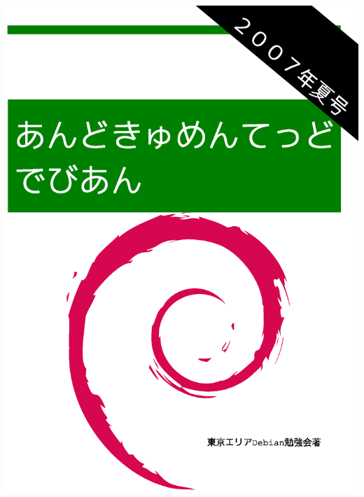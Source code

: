 \documentclass[mingoth,a4paper]{jsarticle}
\begin{document}
\begin{titlepage}

\includegraphics[height=252mm]{image2007-natsu/2007-summer.eps}

\end{titlepage}
\end{document}
